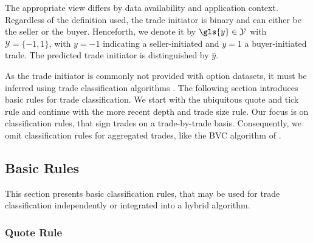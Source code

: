 The appropriate view differs by data availability and application context.
Regardless of the definition used, the trade initiator is binary and can either be the seller or the buyer. Henceforth, we denote it by $\gls{y} \in \mathcal{Y}$ with $\mathcal{Y}=\{-1,1\}$, with $y=-1$ indicating a seller-initiated and $y=1$ a buyer-initiated trade. The predicted trade initiator is distinguished by $\hat{y}$.


As the trade initiator is commonly not provided with option datasets, it must be inferred using trade classification algorithms \autocite[][453]{easleyOptionVolumeStock1998}. The following section introduces basic rules for trade classification. We start with the ubiquitous quote and tick rule and continue with the more recent depth and trade size rule. Our focus is on classification rules, that sign trades on a trade-by-trade basis. Consequently, we omit classification rules for aggregated trades, like the \gls{BVC} algorithm of \textcite[][1466--1468]{easleyFlowToxicityLiquidity2012}.

\subsection{Basic Rules}\label{sec:basic-rules}

This section presents basic classification rules, that may be used for trade classification independently or integrated into a hybrid algorithm.

\subsubsection{Quote Rule}\label{sec:quote-rule}


